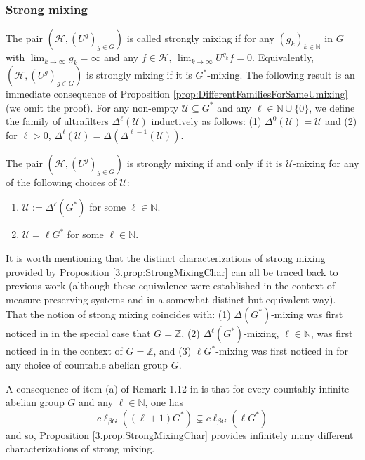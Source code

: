 \documentclass[graybox]{svmult}
\theoremstyle{definition}
\newcommand{\N}{\mathbb{N}}
\newcommand{\Z}{\mathbb{Z}}
\begin{document}
\subsubsection{Strong mixing}
The pair $(\mathcal H,(U^g)_{g\in G})$ is called strongly mixing if for any $(g_k)_{k\in\N}$ in $G$ with $\lim_{k\rightarrow\infty}g_k=\infty$ and any $f\in\mathcal H$, $\lim_{k\rightarrow\infty}U^{g_k}f=0$. Equivalently,  $(\mathcal H,(U^g)_{g\in G})$ is strongly mixing if it is $G^*$-mixing.%
The following result is an immediate consequence of Proposition \ref{prop:DifferentFamiliesForSameUmixing} (we omit the proof). 
For any non-empty $\mathcal U\subseteq G^*$ and any $\ell\in\N\cup\{0\}$, we define the family of ultrafilters $\Delta^\ell(\mathcal U)$ inductively as follows: (1) $\Delta^{0}(\mathcal U)=\mathcal U$ and (2) for $\ell>0$, $\Delta^\ell(\mathcal U)=\Delta(\Delta^{\ell-1}(\mathcal U))$. 
\begin{proposition}\label{3.prop:StrongMixingChar}
    The pair $(\mathcal H,(U^g)_{g\in G})$ is strongly mixing if and only if it is $\mathcal U$-mixing for any of the following choices of $\mathcal U$:
    \begin{enumerate}
        \item $\mathcal U:=\Delta^\ell(G^*)$ for some $\ell\in\N$.
        \item $\mathcal U=\ell G^*$ for some $\ell\in\N$.
    \end{enumerate}
\end{proposition}
\begin{remark}
    It is worth mentioning that the distinct characterizations of strong mixing provided by Proposition \ref{3.prop:StrongMixingChar} can all be traced back to previous work (although these equivalence were established in the context of measure-preserving systems and in a somewhat distinct but equivalent way). 
    That the notion of strong mixing coincides with: (1) $\Delta(G^*)$-mixing was first noticed in \cite[Theorem 4.4]{KuangYeMixingViaFamilies} in the special case that $G=\Z$, (2) $\Delta^\ell(G^*)$-mixing, $\ell\in\N$, was first noticed in \cite[Theorem 1.11]{IteratedDifferenceSets} in the context of $G=\Z$, and (3)  $\ell G^*$-mixing was first noticed in \cite[Theorem 1.6]{AlmostMixingOfAllOrders} for any choice of countable abelian group $G$. 
\end{remark}
\begin{remark}
    A consequence of item (a) of Remark 1.12 in \cite{AlmostMixingOfAllOrders} is that for every countably infinite abelian group $G$ and any $\ell\in\N$, one has
    $$
c\ell_{\beta G}((\ell+1) G^*)\subsetneq c\ell_{\beta G}(\ell G^*)
    $$
    and so, Proposition \ref{3.prop:StrongMixingChar} provides infinitely many different characterizations of strong mixing. 
\end{remark}
\end{document}
